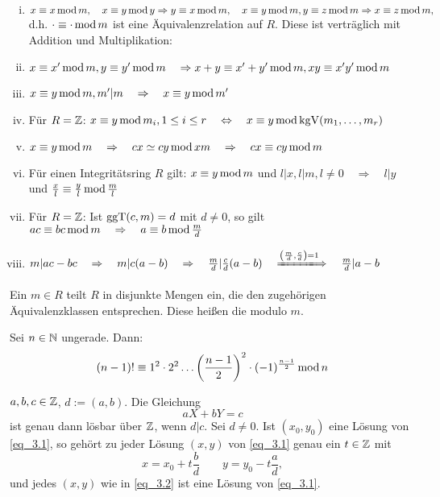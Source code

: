 \begin{falko} \label{F3.2}
	\begin{enumerate}[(i)]
		\item $x \equiv x \modu m, \quad x \equiv y \modu y \Rightarrow y \equiv x \modu m, \quad x \equiv y \modu m, y \equiv z \modu m \Rightarrow x \equiv z \modu m,$ \\
		d.h. $\cdot \equiv \cdot \modu m$ ist eine Äquivalenzrelation auf $R$. Diese ist verträglich mit Addition und Multiplikation:
		\item $x \equiv x' \modu m, y \equiv y' \modu m \quad \Rightarrow x+y \equiv x'+y' \modu m, xy \equiv x'y' \modu m$
		\item $x \equiv y \modu m, m'|m \quad \Rightarrow \quad x \equiv y \modu m'$
		\item Für $R = \ZZ$: \qquad $x \equiv y \modu m_i, 1 \leq i \leq r \quad \Leftrightarrow \quad x \equiv y \modu \kgV(m_1,\dots,m_r)$
		\item $x \equiv y \modu m \quad \Rightarrow \quad cx \simeq cy \modu xm \quad \Rightarrow \quad cx \equiv cy \modu m$
		\item Für einen Integritätsring $R$ gilt: $x \equiv y \modu m$ und $l | x, l|m, l \neq 0 \quad \Rightarrow \quad l|y$ und $\frac{x}{l} \equiv \frac{y}{l} \modu \frac{m}{l}$
		\item Für $R = \ZZ$: Ist $\ggT(c,m) = d$ mit $d \neq 0$, so gilt $ac \kon bc \modu m \quad \Rightarrow \quad a \kon b \modu \frac{m}{d} $
		\item $m | ac-bc \quad \Rightarrow \quad m | c(a-b) \quad \Rightarrow \quad \frac{m}{d} | \frac{c}{d}(a-b) \quad \xLongrightarrow{\enbrace*{\frac{m}{d},\frac{c}{d}}=1} \quad \frac{m}{d} | a-b$
	\end{enumerate}
\end{falko}

\begin{defn}[Restklasse] \label{def_3.2}
	Ein $m \in R$ teilt $R$ in disjunkte Mengen ein, die den zugehörigen Äquivalenzklassen entsprechen. Diese heißen die  modulo $m$. 
\end{defn}

\begin{falko} \label{F3.3}
	Sei $n \in \NN$ ungerade. Dann:
	\[ (n-1)! \kon 1^2 \cdot 2^2 \dots \enbrace*{\frac{n-1}{2}}^2 \cdot (-1)^{\frac{n-1}{2}} \modu n \]
\end{falko}

\begin{falko} \label{F3.4}
	$a,b,c \in \ZZ$, $d:= (a,b)$. Die Gleichung
	\begin{equation}
		aX + bY = c \label{eq_3.1}
	\end{equation}
	ist genau dann lösbar über $\ZZ$, wenn $d | c$. Sei $d \neq 0$. Ist $(x_0,y_0)$ eine Lösung von \eqref{eq_3.1}, so gehört zu jeder Lösung $(x,y)$ von \eqref{eq_3.1} genau ein $t \in \ZZ$ mit
	\begin{equation}
		x = x_0 + t \frac{b}{d} \qquad y = y_0 - t \frac{a}{d}, \label{eq_3.2}
	\end{equation}
	und jedes $(x,y)$ wie in \eqref{eq_3.2} ist eine Lösung von \eqref{eq_3.1}.
\end{falko}

